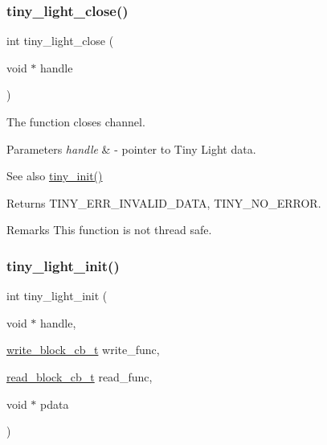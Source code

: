 \subsubsection{\texorpdfstring{tiny\+\_\+light\+\_\+close()}{tiny\_light\_close()}}
{\footnotesize\ttfamily int tiny\+\_\+light\+\_\+close (\begin{DoxyParamCaption}\item[{void $\ast$}]{handle }\end{DoxyParamCaption})}

The function closes channel. 
\begin{DoxyParams}{Parameters}
{\em handle} & -\/ pointer to Tiny Light data. \\
\hline
\end{DoxyParams}
\begin{DoxySeeAlso}{See also}
\hyperlink{group__SIMPLE__API_gab9bfaed3c75551c8b7f3f8b25e766546}{tiny\+\_\+init()} 
\end{DoxySeeAlso}
\begin{DoxyReturn}{Returns}
T\+I\+N\+Y\+\_\+\+E\+R\+R\+\_\+\+I\+N\+V\+A\+L\+I\+D\+\_\+\+D\+A\+TA, T\+I\+N\+Y\+\_\+\+N\+O\+\_\+\+E\+R\+R\+OR. 
\end{DoxyReturn}
\begin{DoxyRemark}{Remarks}
This function is not thread safe. 
\end{DoxyRemark}
\mbox{\label{group__LIGHT__API_ga221cf790724163d1aee89ad6a6c9a14d}} 
\subsubsection{\texorpdfstring{tiny\+\_\+light\+\_\+init()}{tiny\_light\_init()}}
{\footnotesize\ttfamily int tiny\+\_\+light\+\_\+init (\begin{DoxyParamCaption}\item[{void $\ast$}]{handle,  }\item[{\hyperlink{tiny__proto__types_8h_a7f69e669de5baa69a43ee5cb439a7496}{write\+\_\+block\+\_\+cb\+\_\+t}}]{write\+\_\+func,  }\item[{\hyperlink{tiny__proto__types_8h_ae3d867e030f59de94508902f2b84a7ec}{read\+\_\+block\+\_\+cb\+\_\+t}}]{read\+\_\+func,  }\item[{void $\ast$}]{pdata }\end{DoxyParamCaption})}

